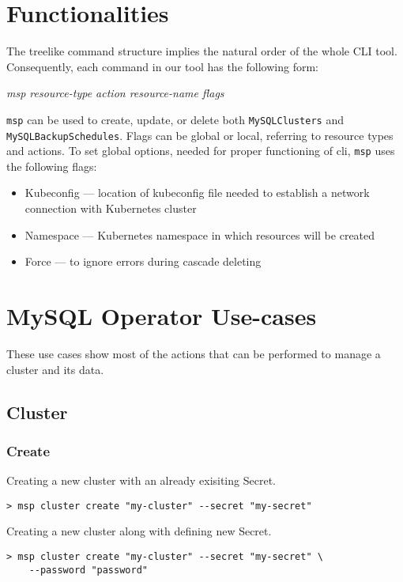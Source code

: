 \section{Functionalities}
The treelike command structure implies the natural order of the whole CLI 
tool. Consequently, each command in our tool has the following form: \\ 
\centerline{\textit{msp resource-type action resource-name flags}}
\texttt{msp} can be used to create, update, or delete both \texttt{MySQLClusters}
and \texttt{MySQLBackupSchedules}. Flags can be global or local, referring 
to resource types and actions. To set global options, needed for proper 
functioning of cli, \texttt{msp} uses the following flags:
\begin{itemize}
	\item Kubeconfig --- location of kubeconfig file needed to establish a network connection with Kubernetes cluster
	\item Namespace --- Kubernetes namespace in which resources will be created
	\item Force --- to ignore errors during cascade deleting
\end{itemize}


\section{MySQL Operator Use-cases}

These use cases show most of the actions that can be performed to manage a cluster and its data.

\subsection{Cluster}

\subsubsection*{Create}
\noindent Creating a new cluster with an already exisiting Secret.

\begin{lstlisting}
> msp cluster create "my-cluster" --secret "my-secret"
\end{lstlisting}

\noindent Creating a new cluster along with defining new Secret.

\begin{lstlisting}
> msp cluster create "my-cluster" --secret "my-secret" \
	--password "password"
\end{lstlisting}

